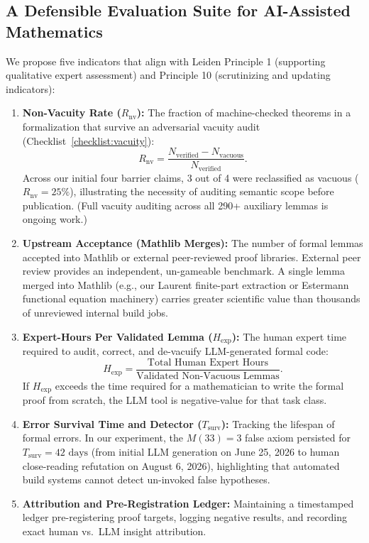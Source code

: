\documentclass[11pt,a4paper]{article}
\theoremstyle{definition}
\theoremstyle{remark}
\begin{document}
\subsection{A Defensible Evaluation Suite for AI-Assisted Mathematics}

We propose five indicators that align with Leiden Principle 1 (supporting qualitative expert assessment) and Principle 10 (scrutinizing and updating indicators):

\begin{enumerate}[label=\textbf{\arabic*.}]
  \item \textbf{Non-Vacuity Rate ($R_{\text{nv}}$):} The fraction of machine-checked theorems in a formalization that survive an adversarial vacuity audit (Checklist~\ref{checklist:vacuity}):
  \[
  R_{\text{nv}} = \frac{N_{\text{verified}} - N_{\text{vacuous}}}{N_{\text{verified}}}.
  \]
  Across our initial four barrier claims, 3 out of 4 were reclassified as vacuous ($R_{\text{nv}} = 25\%$), illustrating the necessity of auditing semantic scope before publication. (Full vacuity auditing across all 290+ auxiliary lemmas is ongoing work.)

  \item \textbf{Upstream Acceptance (Mathlib Merges):} The number of formal lemmas accepted into Mathlib or external peer-reviewed proof libraries. External peer review provides an independent, un-gameable benchmark. A single lemma merged into Mathlib (e.g., our Laurent finite-part extraction or Estermann functional equation machinery) carries greater scientific value than thousands of unreviewed internal build jobs.

  \item \textbf{Expert-Hours Per Validated Lemma ($H_{\text{exp}}$):} The human expert time required to audit, correct, and de-vacuify LLM-generated formal code:
  \[
  H_{\text{exp}} = \frac{\text{Total Human Expert Hours}}{\text{Validated Non-Vacuous Lemmas}}.
  \]
  If $H_{\text{exp}}$ exceeds the time required for a mathematician to write the formal proof from scratch, the LLM tool is negative-value for that task class.

  \item \textbf{Error Survival Time and Detector ($T_{\text{surv}}$):} Tracking the lifespan of formal errors. In our experiment, the $M(33)=3$ false axiom persisted for $T_{\text{surv}} = 42\text{ days}$ (from initial LLM generation on June 25, 2026 to human close-reading refutation on August 6, 2026), highlighting that automated build systems cannot detect un-invoked false hypotheses.

  \item \textbf{Attribution and Pre-Registration Ledger:} Maintaining a timestamped ledger pre-registering proof targets, logging negative results, and recording exact human vs.\ LLM insight attribution.
\end{enumerate}
\end{document}
